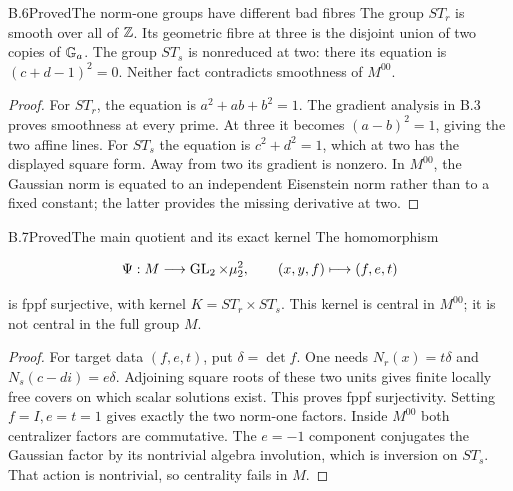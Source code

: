 \begin{statement}{B.6}{Proved}{The norm-one groups have different bad fibres}
The group $ST_r$ is smooth over all of $\mathbb Z$.
Its geometric fibre at three is the disjoint union of two
copies of $\mathbb G_a$. The group $ST_s$ is nonreduced at two:
there its equation is $(c+d-1)^2=0$.
Neither fact contradicts smoothness of $M^{00}$.
\end{statement}
\begin{proof}
For $ST_r$, the equation is $a^2+ab+b^2=1$.
The gradient analysis in B.3 proves smoothness at every prime.
At three it becomes $(a-b)^2=1$, giving the two affine lines.
For $ST_s$ the equation is $c^2+d^2=1$, which at two has
the displayed square form. Away from two its gradient is
nonzero. In $M^{00}$, the Gaussian norm is equated to an
independent Eisenstein norm rather than to a fixed constant;
the latter provides the missing derivative at two.
\end{proof}

\begin{statement}{B.7}{Proved}{The main quotient and its exact kernel}
The homomorphism

$$
\Psi:M\longrightarrow\operatorname{GL}_2\times\mu_2^2,\qquad
 (x,y,f)\longmapsto(f,e,t)
$$

is fppf surjective, with kernel
$K=ST_r\times ST_s$.
This kernel is central in $M^{00}$; it is not central in
the full group $M$.
\end{statement}
\begin{proof}
For target data $(f,e,t)$, put $\delta=\det f$.
One needs $N_r(x)=t\delta$ and $N_s(c-di)=e\delta$.
Adjoining square roots of these two units gives finite
locally free covers on which scalar solutions exist.
This proves fppf surjectivity. Setting $f=I,e=t=1$
gives exactly the two norm-one factors.
Inside $M^{00}$ both centralizer factors are commutative.
The $e=-1$ component conjugates the Gaussian factor by its
nontrivial algebra involution, which is inversion on $ST_s$.
That action is nontrivial, so centrality fails in $M$.
\end{proof}

